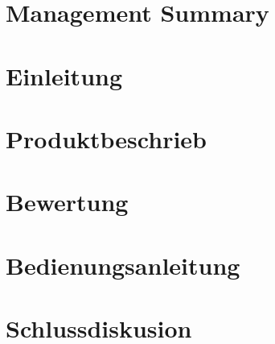 \documentclass[11pt]{scrartcl}
\begin{document}
    

    \setcounter{tocdepth}{2}
    \tableofcontents
    \clearpage

    \section{Management Summary}
    
    \clearpage

    \section{Einleitung}
    
    \clearpage

    \section{Produktbeschrieb}
    
    \clearpage
    \begin{Huge} 
        \textbf{\color{red}{TODO: Weitere Kapitel}}
    \end{Huge}
    
    
    
    \clearpage

    \section{Bewertung}
    
    \clearpage

    \section{Bedienungsanleitung}
    
    \clearpage

    \section{Schlussdiskusion}
    
    \clearpage
\end{document}
